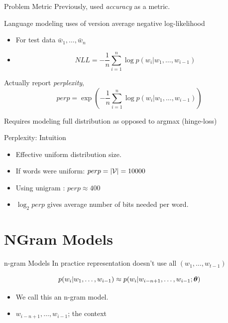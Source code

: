 \documentclass{beamer}
\begin{document}
\begin{frame}{Problem Metric}
  Previously, used \textit{accuracy} as a metric.
  
  \air 

  Language modeling uses of version  average negative
  log-likelihood 
  \begin{itemize}
    \item For test data $\bar{w}_1, \ldots, \bar{w}_n$
    \item \[NLL = -\frac{1}{n}\sum_{i=1}^n \log p(w_i | w_1, \ldots,w_{i-1})\]
  \end{itemize}


  Actually report \textit{perplexity},
  \[ perp = \exp(-\frac{1}{n}\sum_{i=1}^n \log p(w_i | w_1, \ldots,w_{i-1})) \]

  Requires modeling full distribution as opposed to argmax (hinge-loss)
\end{frame}

\begin{frame}{Perplexity: Intuition}
  \begin{itemize}
  \item Effective uniform distribution size.
    \air 
  \item If words were uniform: $perp = |\mathcal{V}| = 10000$
    \air 
    
  \item Using unigram : $perp \approx 400$
    \air 

  \item $\log_2 perp$ gives average number of bits needed per word.
  \end{itemize}
\end{frame}

\section{NGram Models}

\begin{frame}{n-gram Models}
  In practice representation doesn't use all $(w_1, \ldots, w_{t-1})$

  \[p(w_i | w_1, \ldots, w_{i-1}) \approx p(w_i | w_{i - n +1}, \ldots, w_{i-1}; \boldsymbol{\theta}) \]
  
  \begin{itemize}
  \item   We call this an n-gram model.
  \item   $w_{i - n +1}, \ldots, w_{i-1}$; the context
  \end{itemize}
\end{frame}
\end{document}
